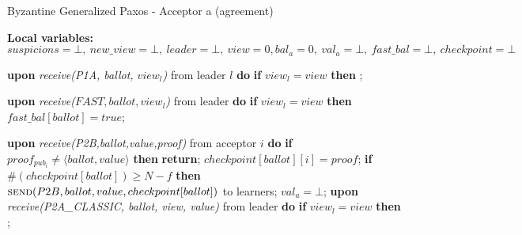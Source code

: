 \begin{algorithm} 
	\caption{Byzantine Generalized Paxos - Acceptor a (agreement)}
	\label{BFT-Acc}
	\textbf{Local variables:} $suspicions = \bot,\ new\_view = \bot,\ leader = \bot,\ view = 0, bal_a = 0,\ val_a = \bot,\ fast\_bal = \bot,\ checkpoint=\bot$
	\begin{algorithmic}[1]
		\State \textbf{upon} \textit{receive(P1A, ballot, $view_l$)} from leader $l$ \textbf{do}
		\State \hspace{\algorithmicindent} \textbf{if} $view_l = view$ \textbf{then}
		\State \hspace{\algorithmicindent}\hspace{\algorithmicindent} ;
		
		\State
		\State \textbf{upon} \textit{receive($FAST,ballot,view_l$)} from leader \textbf{do}
		\State \hspace{\algorithmicindent} \textbf{if} $view_l = view$ \textbf{then}
		\State \hspace{\algorithmicindent}\hspace{\algorithmicindent} $fast\_bal[ballot] = true$;
		
		\State
		\State \textbf{upon} \textit{receive(P2B,ballot,value,proof)} from acceptor $i$ \textbf{do}
		\State \hspace{\algorithmicindent} \textbf{if} $proof_{pub_i} \neq \langle ballot, value \rangle$ \textbf{then}
		\State \hspace{\algorithmicindent}\hspace{\algorithmicindent} \textbf{return};
		\State \hspace{\algorithmicindent} $checkpoint[ballot][i] = proof$;
		\State \hspace{\algorithmicindent} \textbf{if} $\#(checkpoint[ballot]) \geq N-f$ \textbf{then}
		\State \hspace{\algorithmicindent}\hspace{\algorithmicindent} $\Call{send}{P2B, ballot, value, checkpoint[ballot]}$ to learners;
		\State \hspace{\algorithmicindent}\hspace{\algorithmicindent} $val_a = \bot$;
		\State
		\State \textbf{upon} \textit{receive(P2A\_CLASSIC, ballot, view, value)} from leader \textbf{do}
		\State \hspace{\algorithmicindent} \textbf{if} $view_l = view$ \textbf{then}
		\State \hspace{\algorithmicindent}\hspace{\algorithmicindent} ; 


\end{algorithmic}
\end{algorithm}
